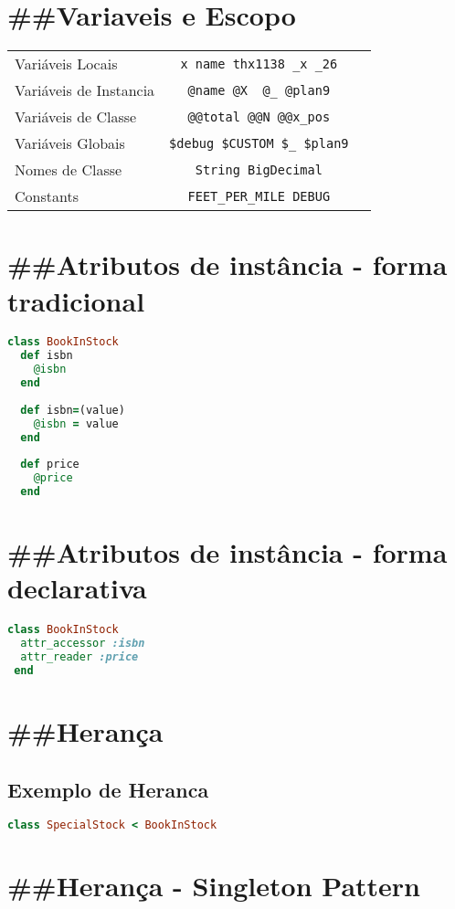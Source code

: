 \documentclass[serif,mathserif]{article}
\begin{document}
\section{\#\#Variaveis e Escopo}

\begin{tabular}{ l | c | r }
Variáveis Locais & \verb|x name thx1138 _x _26| \\
Variáveis de Instancia & \verb|@name @X  @_ @plan9| \\
Variáveis de Classe & \verb|@@total @@N @@x_pos| \\
Variáveis Globais & \verb|$debug $CUSTOM $_ $plan9| \\
Nomes de Classe & \verb|String BigDecimal| \\
Constants & \verb|FEET_PER_MILE DEBUG|
\end{tabular}

\section{\#\#Atributos de instância - forma tradicional}
\begin{lstlisting}[language=ruby]
class BookInStock  
  def isbn
    @isbn
  end
 
  def isbn=(value)
    @isbn = value
  end
 
  def price
    @price
  end
\end{lstlisting}

\section{\#\#Atributos de instância - forma declarativa}
\begin{lstlisting}[language=ruby]
class BookInStock  
  attr_accessor :isbn
  attr_reader :price
 end
\end{lstlisting}

\section{\#\#Herança}
\subsection{Exemplo de Heranca}
\begin{lstlisting}[language=ruby]
class SpecialStock < BookInStock
\end{lstlisting}

\section{\#\#Herança - Singleton Pattern}
\end{document}
